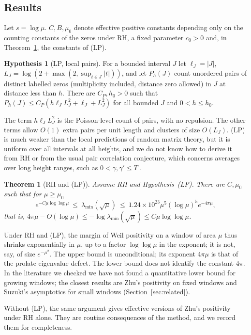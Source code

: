 \documentclass[11pt]{amsart}
\newtheorem{theorem}{Theorem}
\theoremstyle{definition}
\newtheorem{hypothesis}[proposition]{Hypothesis}
\theoremstyle{remark}
\numberwithin{equation}{section}
\begin{document}
\subsection{Results}
Let $s=\log\mu$. $C,B,\mu_0$ denote effective positive constants depending only on the counting constants of the zeros under RH, a fixed parameter $c_0>0$ and, in Theorem~\ref{thm:main}, the constants of (LP).

\begin{hypothesis}[LP, local pairs]\label{hyp:LP}
For a bounded interval $J$ let $\ell_J=|J|$, $L_J=\log(2+\max(2,\sup_{t\in J}|t|))$, and let $P_h(J)$ count unordered pairs of distinct labelled zeros (multiplicity included, distance zero allowed) in $J$ at distance less than $h$. There are $C_P,h_0>0$ such that $P_h(J)\le C_P(h\ell_JL_J^2+\ell_J+L_J^2)$ for all bounded $J$ and $0<h\le h_0$.
\end{hypothesis}

The term $h\ell_JL_J^2$ is the Poisson-level count of pairs, with no repulsion. The other terms allow $O(1)$ extra pairs per unit length and clusters of size $O(L_J)$. (LP) is much weaker than the local predictions of random matrix theory, but it is uniform over all intervals at all heights, and we do not know how to derive it from RH or from the usual pair correlation conjecture, which concerns averages over long height ranges, such as $0<\gamma,\gamma'\le T$ \cite{CGdL20}.

\begin{theorem}[RH and (LP)]\label{thm:main}
Assume RH and Hypothesis~(LP). There are $C,\mu_0$ such that for $\mu\ge\mu_0$
\[
e^{-C\mu\log\log\mu}\ \le\ \lambda_{\min}(\sqrt\mu)\ \le\ 1.24\times10^{23}\mu^5(\log\mu)^5e^{-4\pi\mu},
\]
that is, $4\pi\mu-O(\log\mu)\le-\log\lambda_{\min}(\sqrt\mu)\le C\mu\log\log\mu$.
\end{theorem}

Under RH and (LP), the margin of Weil positivity on a window of area $\mu$ thus shrinks exponentially in $\mu$, up to a factor $\log\log\mu$ in the exponent; it is not, say, of size $e^{-\mu^2}$. The upper bound is unconditional; its exponent $4\pi\mu$ is that of the prolate eigenvalue defect. The lower bound does not identify the constant $4\pi$. In the literature we checked we have not found a quantitative lower bound for growing windows; the closest results are Zhu's positivity on fixed windows and Suzuki's asymptotics for small windows (Section~\ref{sec:related}).

Without (LP), the same argument gives effective versions of Zhu's positivity under RH alone. They are routine consequences of the method, and we record them for completeness.
\end{document}
